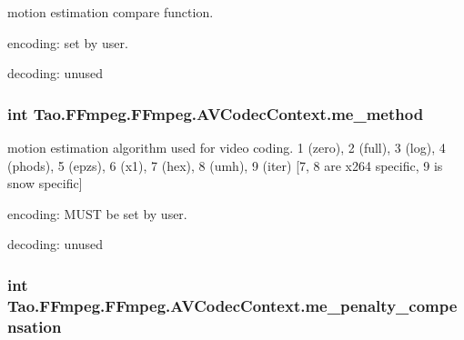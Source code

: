 \label{struct_tao_1_1_f_fmpeg_1_1_f_fmpeg_1_1_a_v_codec_context_ad36b794e852703767cd3faf5284788d5}
motion estimation compare function.
\begin{DoxyItemize}
\item encoding: set by user.
\item decoding: unused 
\end{DoxyItemize}\hypertarget{struct_tao_1_1_f_fmpeg_1_1_f_fmpeg_1_1_a_v_codec_context_a8615f3d2b4bb300b38ed38f9d4bb8cf2}{
\subsubsection[{me\_\-method}]{\setlength{\rightskip}{0pt plus 5cm}int {\bf Tao.FFmpeg.FFmpeg.AVCodecContext.me\_\-method}}}
\label{struct_tao_1_1_f_fmpeg_1_1_f_fmpeg_1_1_a_v_codec_context_a8615f3d2b4bb300b38ed38f9d4bb8cf2}
motion estimation algorithm used for video coding. 1 (zero), 2 (full), 3 (log), 4 (phods), 5 (epzs), 6 (x1), 7 (hex), 8 (umh), 9 (iter) \mbox{[}7, 8 are x264 specific, 9 is snow specific\mbox{]}
\begin{DoxyItemize}
\item encoding: MUST be set by user.
\item decoding: unused 
\end{DoxyItemize}\hypertarget{struct_tao_1_1_f_fmpeg_1_1_f_fmpeg_1_1_a_v_codec_context_a4a6c467e1ec3df7cc0172fe317bc1cb8}{
\subsubsection[{me\_\-penalty\_\-compensation}]{\setlength{\rightskip}{0pt plus 5cm}int {\bf Tao.FFmpeg.FFmpeg.AVCodecContext.me\_\-penalty\_\-compensation}}}
\label{struct_tao_1_1_f_fmpeg_1_1_f_fmpeg_1_1_a_v_codec_context_a4a6c467e1ec3df7cc0172fe317bc1cb8}

